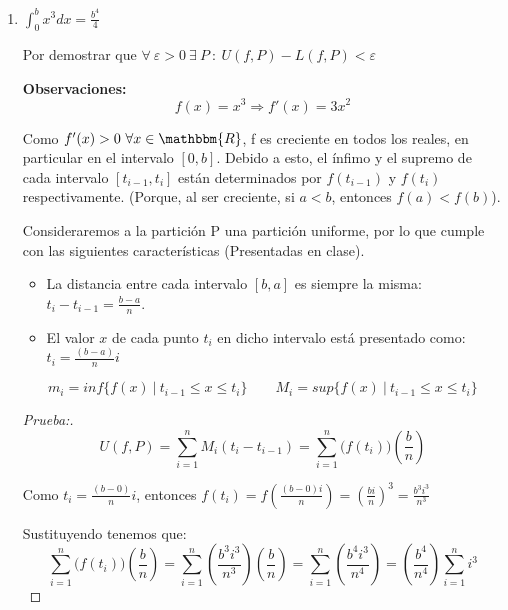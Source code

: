 \documentclass[12pt]{article}
\begin{document}
\begin{enumerate}[\hspace{9px} a)]
\begin{proof}[Prueba:]
            \[sup\{L(f,P)\}=inf\{U(f,P)\}=b^3\]

            \textbf{$\therefore \ f$ es integrable en [0,b] y} \(\displaystyle\int_{0}^{b}3x^2dx=b^3\)
        \end{proof}

    \item \(\displaystyle\int_{0}^{b}x^3dx=\frac{b^4}{4}\)\medskip

        Por demostrar que \(\forall \ \varepsilon>0 \ \exists \ P \ : \ U(f,P)-L(f,P)<\varepsilon\)\medskip

        \textbf{Observaciones:}
        \[f(x)=x^3 \Rightarrow f'(x)=3x^2\]

        Como \(f'(x)>0 \ \forall x \in \mathbbm{R}\), f es creciente en todos los reales, en particular en el intervalo $[0,b]$. Debido a esto, el \'infimo y el supremo de cada intervalo \([t_{i-1},t_i]\) est\'an determinados por \(f(t_{i-1})\) y \(f(t_i)\) respectivamente. (Porque, al ser creciente, si $a<b$, entonces \(f(a)<f(b)\)).\medskip

        Consideraremos a la partici\'on P una partici\'on uniforme, por lo que cumple con las siguientes caracter\'isticas (Presentadas en clase).
        \begin{itemize}
            \item La distancia entre cada intervalo $[b,a]$ es siempre la misma: \(t_i-t_{i-1}=\displaystyle\frac{b-a}{n}\).
            \item El valor $x$ de cada punto $t_i$ en dicho intervalo est\'a presentado como: \(t_i=\displaystyle\frac{(b-a)}{n}i\)
        \end{itemize}

        \[m_i=inf\{f(x) \ | \ t_{i-1} \leq x \leq t_i\} \qquad M_i=sup\{f(x) \ | \ t_{i-1} \leq x \leq t_i\}\]

        \begin{proof}[Prueba:]
            \begin{equation*}%
                U(f,P)=\sum_{i=1}^n M_i(t_i-t_{i-1}) = \sum_{i=1}^n \big(f(t_i)\big)\left(\displaystyle\frac{b}{n}\right)
            \end{equation*}

            Como \(t_i=\displaystyle\frac{(b-0)}{n}i\), entonces \(f(t_i)=f\left(\displaystyle\frac{(b-0)i}{n}\right) = \left(\frac{bi}{n}\right)^3 = \frac{b^3i^3}{n^3}\)

            Sustituyendo tenemos que:
            \begin{equation*}
                \sum_{i=1}^n \big(f(t_i)\big)\left(\displaystyle\frac{b}{n}\right) = \sum_{i=1}^n \left(\frac{b^3i^3}{n^3}\right)\left(\displaystyle\frac{b}{n}\right) = \sum_{i=1}^n \left(\frac{b^4i^3}{n^4}\right) = \left(\frac{b^4}{n^4}\right) \sum_{i=1}^n i^3
            \end{equation*}


\end{proof}
\end{enumerate}
\end{document}
